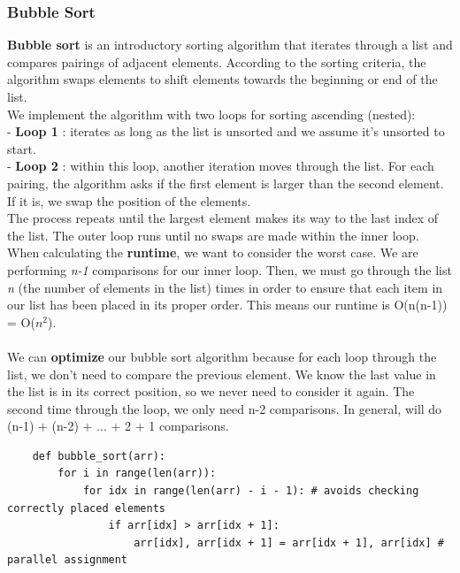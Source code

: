 \documentclass[11pt, a4paper]{article}
\begin{document}
\begin{spacing}{1.1}
	\subsubsection{Bubble Sort}
	\textbf{Bubble sort} is an introductory sorting algorithm that iterates through a list and compares pairings of adjacent elements. According to the sorting criteria, the algorithm swaps elements to shift elements towards the beginning or end of the list. \vspace*{1mm} \\
	We implement the algorithm with two loops for sorting ascending (nested): \\
	\hspace*{3mm} - \textbf{Loop 1} : iterates as long as the list is unsorted and we assume it’s unsorted to start. \\
	\hspace*{3mm} - \textbf{Loop 2} : within this loop, another iteration moves through the list. For each pairing, the algorithm \hspace*{23mm} asks if the first element is larger than the second element. If it is, we swap the position of \hspace*{23mm} the elements. \vspace*{1mm} \\
	The process repeats until the largest element makes its way to the last index of the list. The outer loop runs until no swaps are made within the inner loop. \vspace*{2mm} \\
	When calculating the \textbf{runtime}, we want to consider the worst case. We are performing \textit{n-1} comparisons for our inner loop. Then, we must go through the list \textit{n} (the number of elements in the list) times in order to ensure that each item in our list has been placed in its proper order. This means our runtime is O(n(n-1)) = O($n^2$). \\~\\
	We can \textbf{optimize} our bubble sort algorithm because for each loop through the list, we don't need to compare the previous element. We know the last value in the list is in its correct position, so we never need to consider it again. The second time through the loop, we only need n-2 comparisons. In general, will do (n-1) + (n-2) + ... + 2 + 1 comparisons.
	\begin{lstlisting}
	def bubble_sort(arr):
		for i in range(len(arr)):
			for idx in range(len(arr) - i - 1): # avoids checking correctly placed elements
				if arr[idx] > arr[idx + 1]: 
					arr[idx], arr[idx + 1] = arr[idx + 1], arr[idx] # parallel assignment \end{lstlisting} \vspace*{1mm}

\end{spacing}
\end{document}
